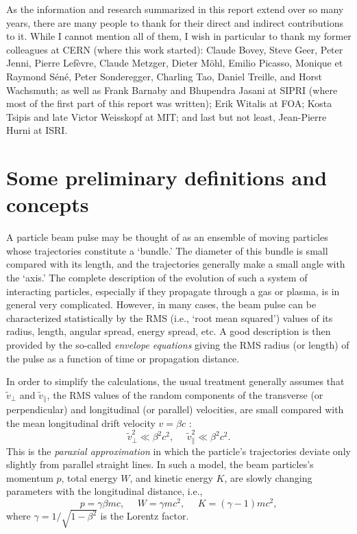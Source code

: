 \documentclass [12pt,a4paper,     ]{report} %
\begin{document}
As the information and research summarized in this report extend over so many years, there are many people to thank for their direct and indirect contributions to it.  While I cannot mention all of them, I wish in particular to thank my former colleagues at CERN (where this work started): Claude Bovey, Steve Geer, Peter Jenni, Pierre Lef\`evre, Claude Metzger, Dieter M\"ohl, Emilio Picasso, Monique et Raymond S\'en\'e, Peter Sonderegger, Charling Tao, Daniel Treille, and Horst Wachsmuth; as well as Frank Barnaby and Bhupendra Jasani at SIPRI (where most of the first part of this report was written); Erik Witalis at FOA; Kosta Tsipis and late Victor Weisskopf at MIT; and last but not least, Jean-Pierre Hurni at ISRI.

%
%


\chapter{Some preliminary definitions and concepts}
\label{def:0}


	A particle beam pulse may be thought of as an ensemble of moving particles whose trajectories constitute a `bundle.'  The diameter of this bundle is small compared with its length, and the trajectories generally make a small angle with the `axis.'  The complete description of the evolution of such a system of interacting particles, especially if they propagate through a gas or plasma, is in general very complicated.  However, in many cases, the beam pulse can be characterized statistically by the RMS (i.e., `root mean squared') values of its radius, length, angular spread, energy spread, etc.  A good description is then provided by the so-called \emph{envelope equations} giving the RMS radius (or length) of the pulse as a function of time or propagation distance.

	In order to simplify the calculations, the usual treatment generally assumes that $\tilde{v}_{\perp}$ and $\tilde{v}_{\|}$, the RMS values of the random components of the transverse (or perpendicular) and longitudinal (or parallel) velocities, are small compared with the mean longitudinal drift velocity $v=\beta c$ :
%
\begin{equation}\label{def:1} %
	\tilde{v}_{\perp}^2 \ll \beta^2c^2,     ~~~  ~~~ 
        \tilde{v}_{\|}^2 \ll \beta^2c^2.
\end{equation}
%
This is the \emph{paraxial approximation} in which the particle's trajectories deviate only slightly from parallel straight lines.  In such a model, the beam particles's momentum $p$, total energy $W$, and kinetic energy $K$, are slowly changing parameters with the longitudinal distance, i.e.,
%
\begin{equation}\label{def:2} %
	  p = \gamma\beta mc,  ~~~  ~~~ 
          W =     \gamma mc^2, ~~~  ~~~ 
          K = (\gamma-1) mc^2,
\end{equation}
%
where $\gamma = 1/\sqrt{1-\beta^2}$ is the Lorentz factor.
\end{document}
